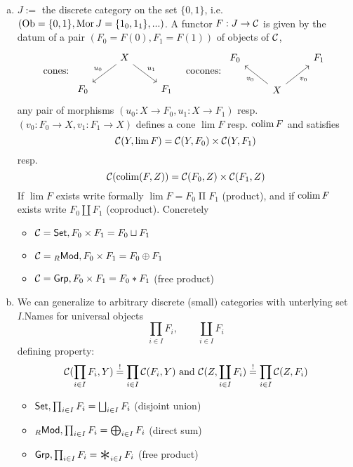 \documentclass[a4paper]{report}
\begin{document}
\begin{exmps}
  \begin{enumerate}[(a)]
\item $J:=$ the discrete category on the set $\{0,1\}$, i.e. $(\operatorname{Ob} = \{0,1\}, \operatorname{Mor} J = \{1_{0}, 1_{1}\}, ...)$. A functor $F: J \to \mathcal{C}$ is given by the datum of a pair $(F_{0} = F(0), F_{1} = F(1))$ of objects of $\mathcal{C}$, \[\text{cones: } \begin{tikzcd}
    & X \arrow[ld, "u_0"'] \arrow[rd, "u_1"] &     \\
F_0 &                                        & F_1
\end{tikzcd}\quad \text{cocones: }\begin{tikzcd}
F_0 &                                        & F_1 \\
    & X \arrow[lu, "v_0"] \arrow[ru, "v_0"'] &
  \end{tikzcd}\]
          any pair of morphisms $(u_{0}: X \to F_{0}, u_{1}: X \to F_{1})$ resp. $(v_{0}: F_{0} \to X, v_{1}: F_{1} \to X)$ defines a cone $\lim F$ resp. $\operatorname*{colim} F$ and satisfies
          \[\mathcal{C}(Y,\lim F) = \mathcal{C}(Y,F_{0}) \times \mathcal{C}(Y,F_{1})\]resp.
          \[\mathcal{C}(\operatorname*{colim}(F,Z)) = \mathcal{C}(F_{0}, Z) \times \mathcal{C}(F_{1}, Z)\]
          If $\lim F$ exists write formally $\lim F = F_{0} \mathrel{\Pi} F_{1}$ (product), and if $\operatorname*{colim} F$ exists write $F_{0} \amalg F_{1}$ (coproduct). Concretely
          \begin{itemize}
\item $\mathcal{C} = \mathsf{Set}, F_{0} \times F_{1} = F_{0} \sqcup F_{1}$
\item $\mathcal{C} = {}_R\mathsf{Mod}, F_{0} \times F_{1} = F_{0} \oplus F_{1}$
\item $\mathcal{C} = \mathsf{Grp}, F_{0} \times F_{1} = F_{0} * F_{1}$ (free product)
          \end{itemize}
    \item We can generalize to arbitrary discrete (small) categories with unterlying set $I$.Names for universal objects \[\prod_{i \in I} F_{i}, \quad \quad \coprod_{i \in I}F_{i}\]
          defining property:
          \[\mathcal{C}(\prod_{i \in I}F_{i}, Y) \overset != \prod_{i \in I} \mathcal{C}(F_{i}, Y) \text{ and } \mathcal{C}(Z, \coprod_{i \in I}F_{i}) \overset != \prod_{i \in I} \mathcal{C}(Z,F_{i})\]
          \begin{itemize}
\item $\mathsf{Set}, \prod_{i \in I} F_{i} = \bigsqcup_{i \in I} F_{i}$ (disjoint union)
\item ${}_R\mathsf{Mod}, \prod_{i \in I} F_{i} = \bigoplus_{i \in I} F_{i}$ (direct sum)
            \item $\Grp, \prod_{i \in I} F_{i} = \bigast_{i \in I} F_{i}$ (free product)

\end{itemize}
\end{enumerate}
\end{exmps}
\end{document}

